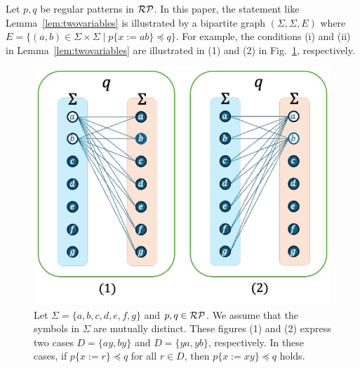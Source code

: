 Let $p,q$ be regular patterns in $\mathcal{RP}$.
In this paper, the statement like Lemma~\ref{lem:twovariables} is illustrated by a bipartite graph $(\Sigma, \Sigma, E)$ where $E = \{(a, b) \in \Sigma\times\Sigma \mid p\{x:=ab\} \preceq q\}$.
For example, the conditions (i) and (ii) in Lemma~\ref{lem:twovariables} are illustrated in (1) and (2) in Fig.~\ref{fig:lem4bigraph}, respectively.


\begin{figure}[t]
  \begin{center}
    \includegraphics[scale=0.525]{figs/lem4bigraph.pdf}
    \caption{Let $\Sigma=\{a,b,c,d,e,f,g\}$ and $p,q \in \mathcal{RP}$. We assume that the symbols in $\Sigma$ are mutually distinct.
    These figures (1) and (2) express two cases $D = \{ ay, by \}$ and $D = \{ ya, yb \}$, respectively.
    In these cases, if $p \{ x := r \} \preceq q$ for all $r \in D$, then $p \{ x := xy \} \preceq q$ holds.}\label{fig:lem4bigraph}
  \end{center}
\end{figure}